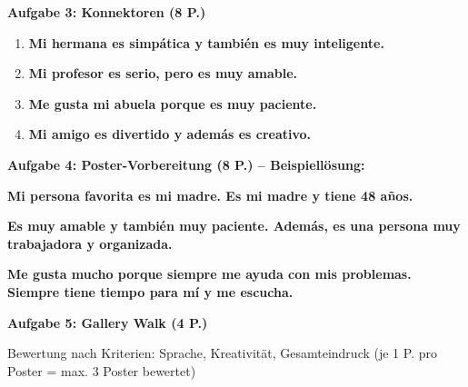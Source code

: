 \documentclass[11pt,a4paper]{article}
\newcommand{\lsg}[1]{\textcolor{loesung}{\textbf{#1}}}
\begin{document}
\begin{gruppenbox}
\vspace{0.5em}

\textbf{Aufgabe 3: Konnektoren (8 P.)}
\begin{enumerate}[label=\alph*), leftmargin=2em, nosep]
    \item \lsg{Mi hermana es simpática y también es muy inteligente.}
    \item \lsg{Mi profesor es serio, pero es muy amable.}
    \item \lsg{Me gusta mi abuela porque es muy paciente.}
    \item \lsg{Mi amigo es divertido y además es creativo.}
\end{enumerate}

\vspace{0.5em}

\textbf{Aufgabe 4: Poster-Vorbereitung (8 P.) -- Beispiellösung:}

\lsg{Mi persona favorita es mi madre. Es mi madre y tiene 48 años.}

\lsg{Es muy amable y también muy paciente. Además, es una persona muy trabajadora y organizada.}

\lsg{Me gusta mucho porque siempre me ayuda con mis problemas. Siempre tiene tiempo para mí y me escucha.}

\vspace{0.5em}

\textbf{Aufgabe 5: Gallery Walk (4 P.)}

Bewertung nach Kriterien: Sprache, Kreativität, Gesamteindruck (je 1 P. pro Poster = max. 3 Poster bewertet)

\end{gruppenbox}

\vspace{1em}
\end{document}
